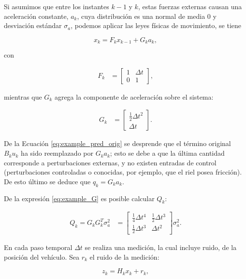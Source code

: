 Si asumimos que entre los instantes $k-1$ y $k$, estas fuerzas externas causan una aceleraci\'on constante, $a_k$, cuya distribuci\'on es una normal de media 0 y desviaci\'on est\'andar $\sigma_a$, podemos aplicar las leyes f\'isicas de movimiento, se tiene

\begin{equation}
x_{k} = F_k x_{k-1} + G_k a_k,
\label{eq:example_pred_orig} 
\end{equation}

con 

\begin{align}
F_k &= \begin{bmatrix}
1 & \Delta t\\
0 & 1 
\end{bmatrix},
\label{eq:example_F}
\end{align}


mientras que $G_k$ agrega la componente de aceleraci\'on sobre el sistema:

\begin{align}
G_k &= \begin{bmatrix}
\frac{1}{2} \Delta t^2\\
\Delta t
\end{bmatrix}.
\label{eq:example_G}
\end{align}

De la Ecuaci\'on \ref{eq:example_pred_orig} se desprende que el t\'ermino original $B_k u_k$ ha sido reemplazado por $G_k a_k$; esto se debe a que la \'ultima cantidad corresponde a perturbaciones externas, y no existen entradas de control (perturbaciones controladas o conocidas, por ejemplo, que el riel posea fricci\'on). De esto \'ultimo se deduce que $q_k = G_k a_k$.
\bigskip

De la expresi\'on \ref{eq:example_G} es posible calcular $Q_k$: 

\begin{align}
Q_k = G_k G_k^T \sigma_a^2 &= \begin{bmatrix}
\frac{1}{4}\Delta t^4 & \frac{1}{2}\Delta t^3\\
 \frac{1}{2}\Delta t^3 & \Delta t^2
\end{bmatrix} \sigma_a^2. 
\end{align}

En cada paso temporal $\Delta t$ se realiza una medici\'on, la cual incluye ruido, de la posici\'on del veh\'iculo. Sea $r_k$ el ruido de la medici\'on:

\begin{equation}
z_k = H_k x_k + r_k,
\label{eq:corr_example}
\end{equation}

